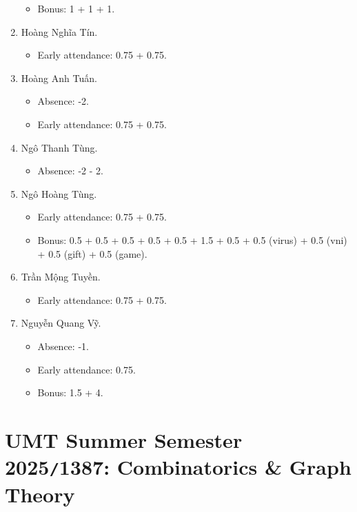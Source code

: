 \documentclass{article}
\begin{document}
\begin{enumerate}
\begin{itemize}
		\item Bonus: 1 + 1 + 1.
	\end{itemize}
	\item {\sc Hoàng Nghĩa Tín.}
	\begin{itemize}
		\item Early attendance: 0.75 + 0.75.
	\end{itemize}
	\item {\sc Hoàng Anh Tuấn.}
	\begin{itemize}
		\item Absence: -2.
		\item Early attendance: 0.75 + 0.75.
	\end{itemize}
	\item {\sc Ngô Thanh Tùng.}
	\begin{itemize}
		\item Absence: -2 - 2.
	\end{itemize}
	\item {\sc Ngô Hoàng Tùng.}
	\begin{itemize}
		\item Early attendance: 0.75 + 0.75.
		\item Bonus: 0.5 + 0.5 + 0.5 + 0.5 + 0.5 + 1.5 + 0.5 + 0.5 (virus) + 0.5 (vni) + 0.5 (gift) + 0.5 (game).
	\end{itemize}
	\item {\sc Trần Mộng Tuyền.}
	\begin{itemize}
		\item Early attendance: 0.75 + 0.75.
	\end{itemize}
	\item {\sc Nguyễn Quang Vỹ.}
	\begin{itemize}
		\item Absence: -1.
		\item Early attendance: 0.75.
		\item Bonus: 1.5 + 4.
	\end{itemize}
\end{enumerate}


\section{UMT Summer Semester 2025{\tt/}1387: Combinatorics \& Graph Theory}
\end{document}

